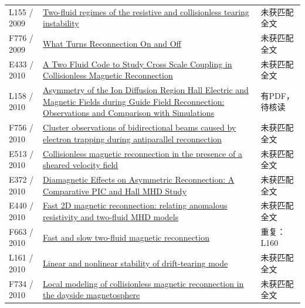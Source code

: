 \documentclass[UTF8,a4paper,11pt,openany,fontset=fandol]{ctexbook}
\begin{document}
\begin{longtable}{P{24mm}P{97mm}P{27mm}}
L155 / 2009 & \href{https://doi.org/10.1063/1.3068470}{Two-fluid regimes of the resistive and collisionless tearing instability} & 未获匹配全文\\

F776 / 2009 & \href{https://ntrs.nasa.gov/search.jsp?R=20090012450}{What Turns Reconnection On and Off} & 未获匹配全文\\

E433 / 2010 & \href{http://ui.adsabs.harvard.edu/abs/2010AGUFMSM51B1813J/abstract}{A Two Fluid Code to Study Cross Scale Coupling in Collisionless Magnetic Reconnection} & 未获匹配全文\\

L158 / 2010 & \href{https://doi.org/10.1103/physrevlett.104.205001}{Asymmetry of the Ion Diffusion Region Hall Electric and Magnetic Fields during Guide Field Reconnection: Observations and Comparison with Simulations} & 有PDF，待核读\\

F756 / 2010 & \href{https://doi.org/10.1029/2009ja014650}{Cluster observations of bidirectional beams caused by electron trapping during antiparallel reconnection} & 未获匹配全文\\

E513 / 2010 & \href{https://doi.org/10.1063/1.3430640}{Collisionless magnetic reconnection in the presence of a sheared velocity field} & 未获匹配全文\\

E372 / 2010 & \href{http://absimage.aps.org/image/DPP10/MWS_DPP10-2010-001669.pdf}{Diamagnetic Effects on Asymmetric Reconnection: A Comparative PIC and Hall MHD Study} & 未获匹配全文\\

E440 / 2010 & \href{http://absimage.aps.org/image/DPP10/MWS_DPP10-2010-000576.pdf}{Fast 2D magnetic reconnection: relating anomalous resistivity and two-fluid MHD models} & 未获匹配全文\\

F663 / 2010 & \href{https://doi.org/10.48550/arxiv.1005.3760}{Fast and slow two-fluid magnetic reconnection} & 重复：L160\\

L161 / 2010 & \href{https://doi.org/10.1088/0029-5515/50/2/025014}{Linear and nonlinear stability of drift-tearing mode} & 未获匹配全文\\

F734 / 2010 & \href{https://doi.org/10.1080/10420150903516569}{Local modeling of collisionless magnetic reconnection in the dayside magnetosphere} & 未获匹配全文\\


\end{longtable}
\end{document}
